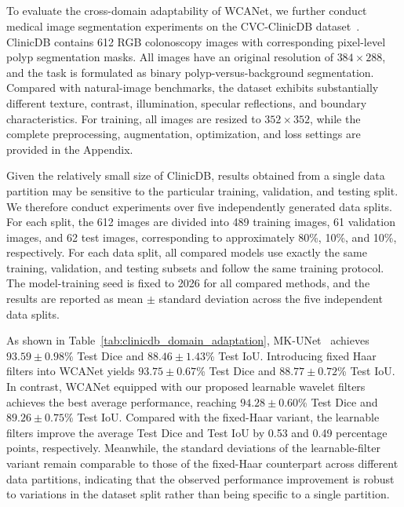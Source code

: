 \documentclass[a4paper,fleqn]{cas-dc}
\begin{document}
\subsection{}


{\color{blue}
To evaluate the cross-domain adaptability of WCANet, we further conduct
medical image segmentation experiments on the CVC-ClinicDB
dataset~\cite{bernal2015wm}.
ClinicDB contains 612 RGB colonoscopy images with corresponding pixel-level
polyp segmentation masks. All images have an original resolution of
$384\times288$, and the task is formulated as binary polyp-versus-background
segmentation. Compared with natural-image benchmarks, the dataset exhibits
substantially different texture, contrast, illumination, specular reflections,
and boundary characteristics. For training, all images are resized to
$352\times352$, while the complete preprocessing, augmentation, optimization,
and loss settings are provided in the Appendix.
}

{\color{green}
Given the relatively small size of ClinicDB, results obtained from a single
data partition may be sensitive to the particular training, validation, and
testing split. We therefore conduct experiments over five independently
generated data splits. For each split, the 612 images are divided into
489 training images, 61 validation images, and 62 test images, corresponding
to approximately 80\%, 10\%, and 10\%, respectively. For each data split,
all compared models use exactly the same training, validation, and testing
subsets and follow the same training protocol. The model-training seed is
fixed to 2026 for all compared methods, and the results are reported as
mean $\pm$ standard deviation across the five independent data splits.
}

{ \color{green}
  As shown in Table~\ref{tab:clinicdb_domain_adaptation}, MK-UNet~\cite{rahman2025mk} achieves $93.59 \pm 0.98$\% Test Dice and $88.46 \pm 1.43$\% Test IoU. Introducing fixed Haar filters into WCANet yields $93.75 \pm 0.67$\% Test Dice and $88.77 \pm 0.72$\% Test IoU. In contrast, WCANet equipped with our proposed learnable wavelet filters achieves the best average performance, reaching $94.28 \pm 0.60$\% Test Dice and $89.26 \pm 0.75$\% Test IoU. Compared with the fixed-Haar variant, the learnable filters improve the average Test Dice and Test IoU by 0.53 and 0.49 percentage points, respectively. Meanwhile, the standard deviations of the learnable-filter variant remain comparable to those of the fixed-Haar counterpart across different data partitions, indicating that the observed performance improvement is robust to variations in the dataset split rather than being specific to a single partition.
}
\end{document}
